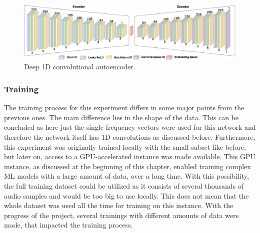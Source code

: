  \begin{figure}[htb!]
	\caption{Deep 1D convolutional autoencoder.}
	\label{fig:cae_1D}
	\centering
	\includegraphics[width=\textwidth]{images/experiments/autoencoder_deep_1D.png}
\end{figure}


\subsubsection{Training}
The training process for this experiment differs in some major points from the previous ones. The main difference lies in the shape of the data. This can be concluded as here just the single frequency vectors were used for this network and therefore the network itself has 1D convolutions as discussed before. Furthermore, this experiment was originally trained locally with the small subset like before, but later on, access to a GPU-accelerated instance was made available. This GPU instance, as discussed at the beginning of this chapter, enabled training complex ML models with a large amount of data, over a long time. With this possibility, the full training dataset could be utilized as it consists of several thousands of audio samples and would be too big to use locally. This does not mean that the whole dataset was used all the time for training on this instance. With the progress of the project, several trainings with different amounts of data were made, that impacted the training process.



